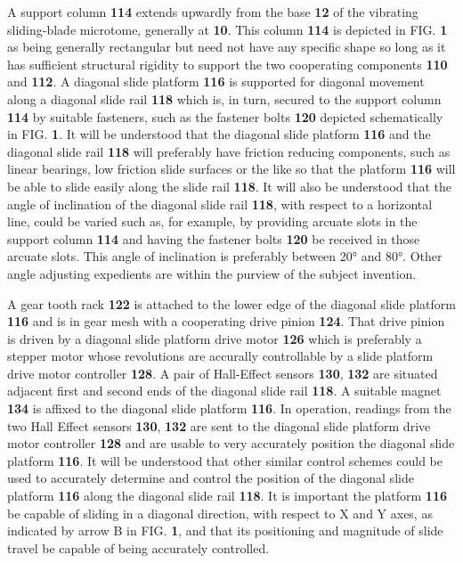 \documentclass{article}
\begin{document}
A support column \textbf{114} extends upwardly from the base \textbf{12} of the vibrating sliding-blade microtome, generally at \textbf{10}. This column \textbf{114} is depicted in FIG. \textbf{1} as being generally rectangular but need not have any specific shape so long as it has sufficient structural rigidity to support the two cooperating components \textbf{110} and \textbf{112}. A diagonal slide platform \textbf{116} is supported for diagonal movement along a diagonal slide rail \textbf{118} which is, in turn, secured to the support column \textbf{114} by suitable fasteners, such as the fastener bolts \textbf{120} depicted schematically in FIG. \textbf{1}. It will be understood that the diagonal slide platform \textbf{116} and the diagonal slide rail \textbf{118} will preferably have friction reducing components, such as linear bearings, low friction slide surfaces or the like so that the platform \textbf{116} will be able to slide easily along the slide rail \textbf{118}. It will also be understood that the angle of inclination of the diagonal slide rail \textbf{118}, with respect to a horizontal line, could be varied such as, for example, by providing arcuate slots in the support column \textbf{114} and having the fastener bolts \textbf{120} be received in those arcuate slots. This angle of inclination is preferably between 20° and 80°. Other angle adjusting expedients are within the purview of the subject invention.

A gear tooth rack \textbf{122} is attached to the lower edge of the diagonal slide platform \textbf{116} and is in gear mesh with a cooperating drive pinion \textbf{124}. That drive pinion is driven by a diagonal slide platform drive motor \textbf{126} which is preferably a stepper motor whose revolutions are accurally controllable by a slide platform drive motor controller \textbf{128}. A pair of Hall-Effect sensors \textbf{130}, \textbf{132} are situated adjacent first and second ends of the diagonal slide rail \textbf{118}. A suitable magnet \textbf{134} is affixed to the diagonal slide platform \textbf{116}. In operation, readings from the two Hall Effect sensors \textbf{130}, \textbf{132} are sent to the diagonal slide platform drive motor controller \textbf{128} and are usable to very accurately position the diagonal slide platform \textbf{116}. It will be understood that other similar control schemes could be used to accurately determine and control the position of the diagonal slide platform \textbf{116} along the diagonal slide rail \textbf{118}. It is important the platform \textbf{116} be capable of sliding in a diagonal direction, with respect to X and Y axes, as indicated by arrow B in FIG. \textbf{1}, and that its positioning and magnitude of slide travel be capable of being accurately controlled.
\end{document}
